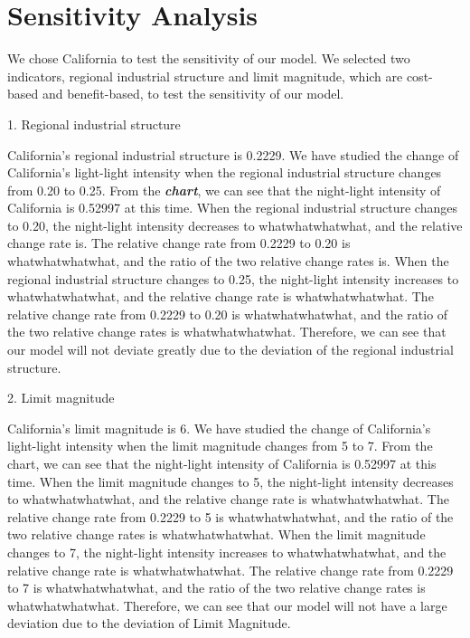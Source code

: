 \MinParskip{}

\section{Sensitivity Analysis}

We chose California to test the sensitivity of our model. We selected two indicators, regional industrial structure and limit magnitude, which are cost-based and benefit-based, to test the sensitivity of our model.

1. Regional industrial structure

California's regional industrial structure is 0.2229. We have studied the change of California's light-light intensity when the regional industrial structure changes from 0.20 to 0.25. From the \textbf{\textit{chart}}, we can see that the night-light intensity of California is 0.52997 at this time. When the regional industrial structure changes to 0.20, the night-light intensity decreases to whatwhatwhatwhat, and the relative change rate is. The relative change rate from 0.2229 to 0.20 is whatwhatwhatwhat, and the ratio of the two relative change rates is. When the regional industrial structure changes to 0.25, the night-light intensity increases to whatwhatwhatwhat, and the relative change rate is whatwhatwhatwhat. The relative change rate from 0.2229 to 0.20 is whatwhatwhatwhat, and the ratio of the two relative change rates is whatwhatwhatwhat. Therefore, we can see that our model will not deviate greatly due to the deviation of the regional industrial structure.

2. Limit magnitude

California's limit magnitude is 6. We have studied the change of California's light-light intensity when the limit magnitude changes from 5 to 7. From the chart, we can see that the night-light intensity of California is 0.52997 at this time. When the limit magnitude changes to 5, the night-light intensity decreases to whatwhatwhatwhat, and the relative change rate is whatwhatwhatwhat. The relative change rate from 0.2229 to 5 is whatwhatwhatwhat, and the ratio of the two relative change rates is whatwhatwhatwhat. When the limit magnitude changes to 7, the night-light intensity increases to whatwhatwhatwhat, and the relative change rate is whatwhatwhatwhat. The relative change rate from 0.2229 to 7 is whatwhatwhatwhat, and the ratio of the two relative change rates is whatwhatwhatwhat. Therefore, we can see that our model will not have a large deviation due to the deviation of Limit Magnitude.